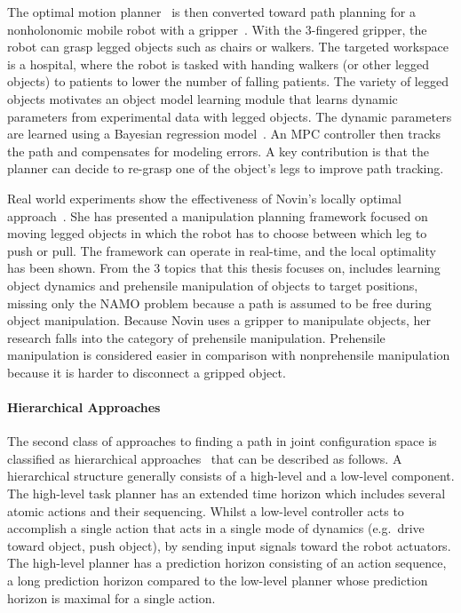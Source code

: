 The optimal motion planner~\cite{sabbaghnovin_optimal_2016} is then converted toward path planning for a nonholonomic mobile robot with a gripper~\cite{novin_dynamic_2018}. With the 3-fingered gripper, the robot can grasp legged objects such as chairs or walkers. The targeted workspace is a hospital, where the robot is tasked with handing walkers (or other legged objects) to patients to lower the number of falling patients. The variety of legged objects motivates an object model learning module that learns dynamic parameters from experimental data with legged objects. The dynamic parameters are learned using a Bayesian regression model~\cite{scholz_navigation_2016}. An \ac{MPC} controller then tracks the path and compensates for modeling errors. A key contribution is that the planner can decide to re-grasp one of the object's legs to improve path tracking.\bs

Real world experiments show the effectiveness of Novin's locally optimal approach~\cite{sabbaghnovin_model_2021}. She has presented a manipulation planning framework focused on moving legged objects in which the robot has to choose between which leg to push or pull. The framework can operate in real-time, and the local optimality has been shown. From the 3 topics that this thesis focuses on, \citeauthor{sabbaghnovin_model_2021} includes learning object dynamics and prehensile manipulation of objects to target positions, missing only the \ac{NAMO} problem because a path is assumed to be free during object manipulation. Because Novin uses a gripper to manipulate objects, her research falls into the category of prehensile manipulation. Prehensile manipulation is considered easier in comparison with nonprehensile manipulation because it is harder to disconnect a gripped object.\bs


\paragraph{Hierarchical Approaches}
The second class of approaches to finding a path in joint configuration space is classified as hierarchical approaches~\cite{ellis_navigation_2022,krontiris_dealing_2015,scholz_navigation_2016,vega-brown_asymptotically_2020,wang_affordancebased_2020} that can be described as follows. A hierarchical structure generally consists of a high-level and a low-level component. The high-level task planner has an extended time horizon which includes several atomic actions and their sequencing. Whilst a low-level controller acts to accomplish a single action that acts in a single mode of dynamics (e.g.~drive toward object, push object), by sending input signals toward the robot actuators. The high-level planner has a prediction horizon consisting of an action sequence, a long prediction horizon compared to the low-level planner whose prediction horizon is maximal for a single action.\bs

